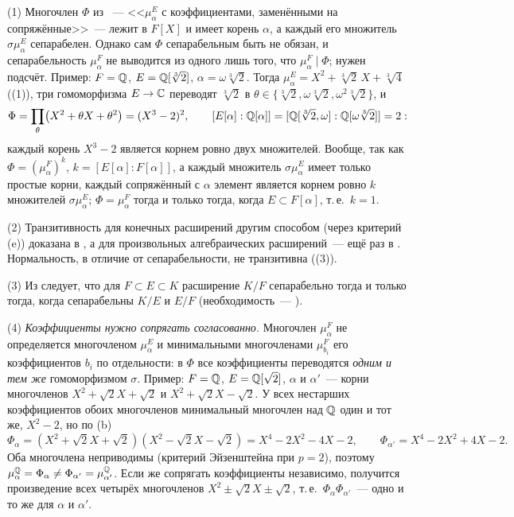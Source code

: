\begin{remark}[3.15d]
(1) Многочлен $\Phi$ из ~--- <<$\mu^E_\alpha$ с коэффициентами, заменёнными на сопряжённые>>~--- лежит в $F[X]$ и имеет
корень $\alpha$, а каждый его множитель $\sigma\mu^E_\alpha$ сепарабелен. Однако сам $\Phi$ сепарабельным быть не обязан, и
сепарабельность $\mu^F_\alpha$ не выводится из одного лишь того, что $\mu^F_\alpha\mid\Phi$; нужен подсчёт. Пример: $F=\mathbb Q$,
$E=\mathbb Q[\sqrt[3]2]$, $\alpha=\omega\sqrt[3]2$. Тогда $\mu^E_\alpha=X^2+\sqrt[3]2\,X+\sqrt[3]4$ ((1)), три гомоморфизма $E\to\mathbb C$
переводят $\sqrt[3]2$ в $\theta\in\{\sqrt[3]2,\omega\sqrt[3]2,\omega^2\sqrt[3]2\}$, и
\[
\Phi=\prod_\theta\bigl(X^2+\theta X+\theta^2\bigr)=(X^3-2)^2,\qquad [E[\alpha]:\mathbb Q[\alpha]]=[\mathbb Q[\sqrt[3]2,\omega]:\mathbb Q[\omega\sqrt[3]2]]=2:
\]
каждый корень $X^3-2$ является корнем ровно двух множителей. Вообще, так как $\Phi=(\mu^F_\alpha)^k$, $k=[E[\alpha]:F[\alpha]]$, а
каждый множитель $\sigma\mu^E_\alpha$ имеет только простые корни, каждый сопряжённый с $\alpha$ элемент является корнем ровно $k$
множителей $\sigma\mu^E_\alpha$; $\Phi=\mu^F_\alpha$ тогда и только тогда, когда $E\subset F[\alpha]$, т.\,е.\ $k=1$.

(2) Транзитивность для конечных расширений другим способом (через критерий (e)) доказана в , а для
произвольных алгебраических расширений~--- ещё раз в . Нормальность, в отличие от сепарабельности, не
транзитивна ((3)).

(3) Из  следует, что для $F\subset E\subset K$ расширение $K/F$ сепарабельно тогда и только тогда, когда сепарабельны
$K/E$ и $E/F$ (необходимость~--- ).

(4) \emph{Коэффициенты нужно сопрягать согласованно.} Многочлен $\mu^F_\alpha$ не определяется многочленом $\mu^E_\alpha$ и
минимальными многочленами $\mu^F_{b_i}$ его коэффициентов $b_i$ по отдельности: в $\Phi$ все коэффициенты переводятся
\emph{одним и тем же} гомоморфизмом $\sigma$. Пример: $F=\mathbb Q$, $E=\mathbb Q[\sqrt2]$, $\alpha$ и $\alpha'$~--- корни многочленов
$X^2+\sqrt2X+\sqrt2$ и $X^2+\sqrt2X-\sqrt2$. У всех нестарших коэффициентов обоих многочленов минимальный многочлен над $\mathbb Q$
один и тот же, $X^2-2$, но по (b)
\[
\Phi_\alpha=(X^2+\sqrt2X+\sqrt2)(X^2-\sqrt2X-\sqrt2)=X^4-2X^2-4X-2,\qquad \Phi_{\alpha'}=X^4-2X^2+4X-2 .
\]
Оба многочлена неприводимы (критерий Эйзенштейна при $p=2$), поэтому $\mu^\mathbb Q_\alpha=\Phi_\alpha\ne\Phi_{\alpha'}=\mu^\mathbb Q_{\alpha'}$.
Если же сопрягать коэффициенты независимо, получится произведение всех четырёх многочленов $X^2\pm\sqrt2X\pm\sqrt2$, т.\,е.\
$\Phi_\alpha\Phi_{\alpha'}$~--- одно и то же для $\alpha$ и $\alpha'$.


\end{remark}
